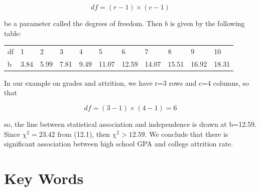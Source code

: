 \documentclass[11pt, chapterprefix=true]{scrbook}\usepackage[]{graphicx}\usepackage[]{color}
\begin{document}
\begin{equation*}
df = (r - 1) \times (c - 1)
\end{equation*}

\vspace{1cm}
be a parameter called the degrees of freedom.  Then $b$ is given by the following table:

\begin{table}[ht]
\centering
\begin{tabular}{@{} lllllllllll @{}} \hline
df & 1&2&3&4&5&6&7&8&9&10 \\
b  & 3.84&5.99&7.81&9.49&11.07&12.59&14.07&15.51&16.92&18.31 \\ \hline
\end{tabular}
\end{table}

In our example on grades and attrition, we have r=3 rows and c=4 columns, so that

\begin{equation*}
df = (3 - 1) \times (4 - 1) = 6
\end{equation*}

so, the line between statistical association and independence is drawn at b=12.59.  
Since $\chi^2 = 23.42$ from (12.1), then $\chi^2 > 12.59$.   We conclude that there is significant association between high school GPA and college attrition rate.

\section{Key Words}


\twocolumn

\section{}
 
\end{document}
